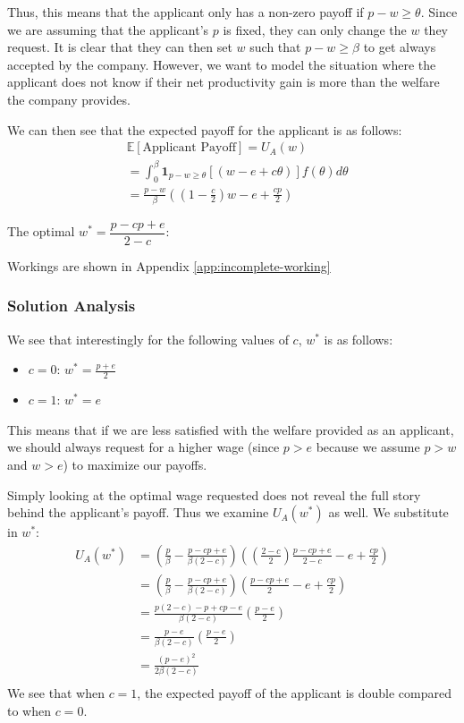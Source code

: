 \documentclass[a4paper, 12pt]{article}
\begin{document}
Thus, this means that the applicant only has a non-zero payoff if $p - w\geq \theta$. Since we are assuming that the applicant's $p$ is fixed, they can only change the $w$ they request. It is clear that they can then set $w$ such that $p-w\geq \beta$ to get always accepted by the company. However, we want to model the situation where the applicant does not know if their net productivity gain is more than the welfare the company provides.

We can then see that the expected payoff for the applicant is as follows:
\begin{align*}
    &\mathbb{E}[\text{Applicant Payoff}] = U_A(w)  \\
    &= \int_0^{\beta} \mathbf{1}_{p-w\geq \theta}\left[(w - e + c\theta)\right] f(\theta) d\theta \\
    &= \frac{p-w}{\beta} \left(\left(1 - \frac{c}{2}\right)w - e + \frac{cp}{2}\right)
\end{align*}

The optimal $w^* = \dfrac{p-cp + e}{2 - c}$:

Workings are shown in Appendix \ref{app:incomplete-working}

\subsubsection{Solution Analysis}

We see that interestingly for the following values of $c$, $w^*$ is as follows:

\begin{itemize}[noitemsep]
    \item $c = 0$: $w^* = \frac{p+e}{2}$
    \item $c = 1$: $w^* = e$
\end{itemize}

This means that if we are less satisfied with the welfare provided as an applicant, we should always request for a higher wage (since $p > e$ because we assume $p > w$ and $w > e$) to maximize our payoffs.

Simply looking at the optimal wage requested does not reveal the full story behind the applicant's payoff. Thus we examine $U_A(w^*)$ as well. We substitute in $w^*$:
\begin{align*}
    U_A(w^*) &= \left(\frac{p}{\beta} - \frac{p-cp + e}{\beta(2-c)}\right) \left(\left(\frac{2-c}{2}\right)\frac{p-cp+e}{2-c} - e + \frac{cp}{2}\right) \\
    &= \left(\frac{p}{\beta} - \frac{p-cp + e}{\beta(2-c)}\right) \left(\frac{p-cp+e}{2} - e + \frac{cp}{2}\right) \\
    &= \frac{p(2-c) - p + cp - e}{\beta(2-c)} \left(\frac{p-e}{2} \right) \\
    &= \frac{p - e}{\beta(2-c)} \left(\frac{p-e}{2} \right) \\
    &= \frac{(p - e)^2}{2\beta(2-c)} \\
\end{align*}
We see that when $c = 1$, the expected payoff of the applicant is double compared to when $c = 0$.
\end{document}
